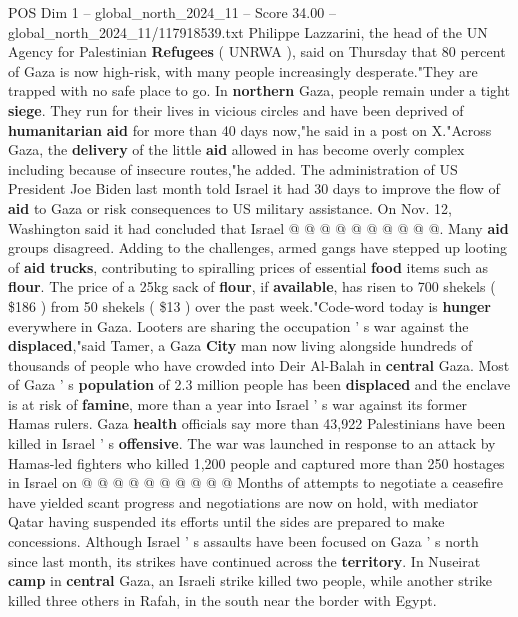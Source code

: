\begin{textsample}{POS Dim 1 – global\_north\_2024\_11 – Score 34.00 – global\_north\_2024\_11/117918539.txt}
Philippe Lazzarini, the head of the UN Agency for Palestinian \textbf{Refugees} ( UNRWA ), said on Thursday that 80 percent of Gaza is now high-risk, with many people increasingly desperate."They are trapped with no safe place to go.
In \textbf{northern} Gaza, people remain under a tight \textbf{siege}.
They run for their lives in vicious circles and have been deprived of \textbf{humanitarian} \textbf{aid} for more than 40 days now,"he said in a post on X."Across Gaza, the \textbf{delivery} of the little \textbf{aid} allowed in has become overly complex including because of insecure routes,"he added.
The administration of US President Joe Biden last month told Israel it had 30 days to improve the flow of \textbf{aid} to Gaza or risk consequences to US military assistance.
On Nov. 12, Washington said it had concluded that Israel @ @ @ @ @ @ @ @ @ @.
Many \textbf{aid} groups disagreed.
Adding to the challenges, armed gangs have stepped up looting of \textbf{aid} \textbf{trucks}, contributing to spiralling prices of essential \textbf{food} items such as \textbf{flour}.
The price of a 25kg sack of \textbf{flour}, if \textbf{available}, has risen to 700 shekels ( \$186 ) from 50 shekels ( \$13 ) over the past week."Code-word today is \textbf{hunger} everywhere in Gaza.
Looters are sharing the occupation ' s war against the \textbf{displaced},"said Tamer, a Gaza \textbf{City} man now living alongside hundreds of thousands of people who have crowded into Deir Al-Balah in \textbf{central} Gaza.
Most of Gaza ' s \textbf{population} of 2.3 million people has been \textbf{displaced} and the enclave is at risk of \textbf{famine}, more than a year into Israel ' s war against its former Hamas rulers.
Gaza \textbf{health} officials say more than 43,922 Palestinians have been killed in Israel ' s \textbf{offensive}.
The war was launched in response to an attack by Hamas-led fighters who killed 1,200 people and captured more than 250 hostages in Israel on @ @ @ @ @ @ @ @ @ @ Months of attempts to negotiate a ceasefire have yielded scant progress and negotiations are now on hold, with mediator Qatar having suspended its efforts until the sides are prepared to make concessions.
Although Israel ' s assaults have been focused on Gaza ' s north since last month, its strikes have continued across the \textbf{territory}.
In Nuseirat \textbf{camp} in \textbf{central} Gaza, an Israeli strike killed two people, while another strike killed three others in Rafah, in the south near the border with Egypt.

\end{textsample}
